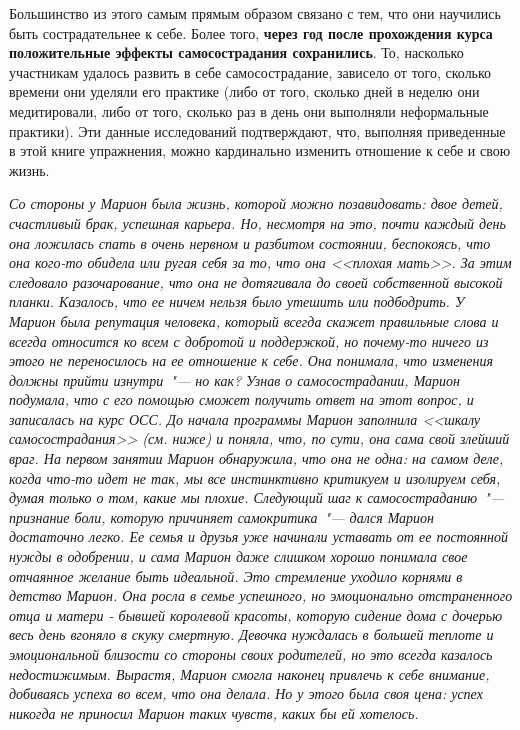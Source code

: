 Большинство из этого самым прямым образом связано с тем, что они научились быть сострадательнее к себе. Более того, \textbf{через год после прохождения курса положительные эффекты самосострадания сохранились}. То, насколько участникам удалось развить в себе самосострадание, зависело от того, сколько времени они уделяли его практике (либо от того, сколько дней в неделю они медитировали, либо от того, сколько раз в день они выполняли неформальные практики). Эти данные исследований подтверждают, что, выполняя приведенные в этой книге упражнения, можно кардинально изменить отношение к себе и свою жизнь.

\vspace{2ex}

\textit{Со стороны у Марион была жизнь, которой можно позавидовать: двое детей, счастливый брак, успешная карьера. Но, несмотря на это, почти каждый день она ложилась спать в очень нервном и разбитом состоянии, беспокоясь, что она кого-то обидела или ругая себя за то, что она <<плохая мать>>. За этим следовало разочарование, что она не дотягивала до своей собственной высокой планки. Казалось, что ее ничем нельзя было утешить или подбодрить. У Марион была репутация человека, который всегда скажет правильные слова и всегда относится ко всем с добротой и поддержкой, но почему-то ничего из этого не переносилось на ее отношение к себе. Она понимала, что изменения должны прийти изнутри~"--- но как? Узнав о самосострадании, Марион подумала, что с его помощью сможет получить ответ на этот вопрос, и записалась на курс ОСС. До начала программы Марион заполнила <<шкалу самосострадания>> (см. ниже) и поняла, что, по сути, она сама свой злейший враг. На первом занятии Марион обнаружила, что она не одна: на самом деле, когда что-то идет не так, мы все инстинктивно критикуем и изолируем себя, думая только о том, какие мы плохие. Следующий шаг к самосостраданию~"--- признание боли, которую причиняет самокритика~"--- дался Марион достаточно легко. Ее семья и друзья уже начинали уставать от ее постоянной нужды в одобрении, и сама Марион даже слишком хорошо понимала свое отчаянное желание быть идеальной. Это стремление уходило корнями в детство Марион. Она росла в семье успешного, но эмоционально отстраненного отца и матери - бывшей королевой красоты, которую сидение дома с дочерью весь день вгоняло в скуку смертную. Девочка нуждалась в большей теплоте и эмоциональной близости со стороны своих родителей, но это всегда казалось недостижимым. Вырастя, Марион смогла наконец привлечь к себе внимание, добиваясь успеха во всем, что она делала. Но у этого была своя цена: успех никогда не приносил Марион таких чувств, каких бы ей хотелось.} 

